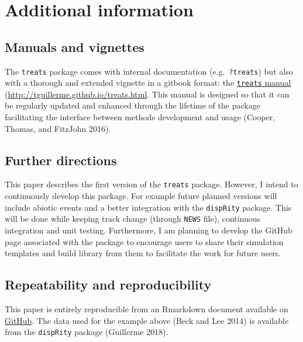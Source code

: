 \documentclass[
]{article}
\begin{document}
\hypertarget{additional-information}{%
\section{Additional information}\label{additional-information}}

\hypertarget{manuals-and-vignettes}{%
\subsection{Manuals and vignettes}\label{manuals-and-vignettes}}

The \texttt{treats} package comes with internal documentation
(e.g.~\texttt{?treats}) but also with a thorough and extended vignette
in a gitbook format: the
\href{http://tguillerme.github.io/treats.html}{\texttt{treats} manual}
(\url{http://tguillerme.github.io/treats.html}. This manual is designed
so that it can be regularly updated and enhanced through the lifetime of
the package facilitating the interface between methods development and
usage (Cooper, Thomas, and FitzJohn 2016).

\hypertarget{further-directions}{%
\subsection{Further directions}\label{further-directions}}

This paper describes the first version of the \texttt{treats} package.
However, I intend to continuously develop this package. For example
future planned versions will include abiotic events and a better
integration with the \texttt{dispRity} package. This will be done while
keeping track change (through \texttt{NEWS} file), continuous
integration and unit testing. Furthermore, I am planning to develop the
GitHub page associated with the package to encourage users to share
their simulation templates and build library from them to facilitate the
work for future users.

\hypertarget{repeatability-and-reproducibility}{%
\subsection{Repeatability and
reproducibility}\label{repeatability-and-reproducibility}}

This paper is entirely reproducible from an Rmarkdown document available
on \href{https://github.com/TGuillerme/treats/inst/paper.Rmd}{GitHub}.
The data used for the example above (Beck and Lee 2014) is available
from the \texttt{dispRity} package (Guillerme 2018).
\end{document}

